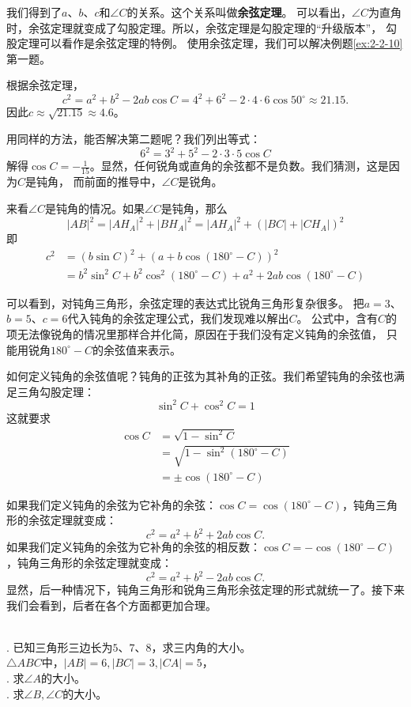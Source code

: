\documentclass[12pt,UTF8,fontset=none]{ctexbook}
\begin{document}
我们得到了$a$、$b$、$c$和$\angle C$的关系。这个关系叫做\textbf{余弦定理}。
可以看出，$\angle C$为直角时，余弦定理就变成了勾股定理。所以，余弦定理是勾股定理的“升级版本”，
勾股定理可以看作是余弦定理的特例。
使用余弦定理，我们可以解决例题\ref{ex:2-2-10}第一题。
\begin{so}
    根据余弦定理，
    $$c^2 = a^2 + b^2 - 2ab \cos C = 4^2 + 6^2 - 2\cdot 4\cdot 6 \cos 50^\circ \approx 21.15.$$
    因此$c \approx \sqrt{21.15} \approx 4.6$。
\end{so}
用同样的方法，能否解决第二题呢？我们列出等式：
$$6^2 = 3^2 + 5^2 - 2 \cdot 3\cdot 5 \cos C $$
解得$\cos C = -\frac{1}{15}$。显然，任何锐角或直角的余弦都不是负数。我们猜测，这是因为$C$是钝角，
而前面的推导中，$\angle C$是锐角。

来看$\angle C$是钝角的情况。如果$\angle C$是钝角，那么
$$ |AB|^2 = |AH_A|^2 + |BH_A|^2 = |AH_A|^2 + (|BC| + |CH_A|)^2$$
即
\begin{align*}
    c^2 &= (b\sin C)^2 + (a + b\cos (180^\circ - C))^2  \\
    &= b^2\sin^2 C + b^2\cos^2 (180^\circ - C) + a^2 + 2ab\cos (180^\circ - C) 
\end{align*}

可以看到，对钝角三角形，余弦定理的表达式比锐角三角形复杂很多。
把$a=3$、$b=5$、$c=6$代入钝角的余弦定理公式，我们发现难以解出$C$。
公式中，含有$C$的项无法像锐角的情况里那样合并化简，原因在于我们没有定义钝角的余弦值，
只能用锐角$180^\circ - C$的余弦值来表示。

如何定义钝角的余弦值呢？钝角的正弦为其补角的正弦。我们希望钝角的余弦也满足三角勾股定理：
$$ \sin^2 C +  \cos^2 C = 1 $$
这就要求
\begin{align*}
    \cos C &= \sqrt{1 - \sin^2 C}  \\
    &= \sqrt{1 - \sin^2 (180^\circ - C)}  \\
    &= \pm\cos (180^\circ - C) 
\end{align*}

如果我们定义钝角的余弦为它补角的余弦：$ \cos C = \cos (180^\circ - C)$，钝角三角形的余弦定理就变成：
$$ c^2 = a^2 + b^2 + 2ab \cos C.$$
如果我们定义钝角的余弦为它补角的余弦的相反数：$ \cos C = -\cos (180^\circ - C)$，钝角三角形的余弦定理就变成：
$$ c^2 = a^2 + b^2 - 2ab \cos C.$$
显然，后一种情况下，钝角三角形和锐角三角形余弦定理的形式就统一了。接下来我们会看到，后者在各个方面都更加合理。

\begin{xt}
    \mbox{}\\
    . 已知三角形三边长为$5$、$7$、$8$，求三内角的大小。\\
    $\triangle ABC$中，$|AB|=6,|BC|=3,|CA|=5$，\\
    . 求$\angle A$的大小。\\
    . 求$\angle B, \angle C$的大小。
\end{xt}
\end{document}
